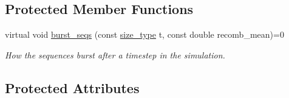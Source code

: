 \subsection*{Protected Member Functions}
\begin{DoxyCompactItemize}
\item 
virtual void \hyperlink{classretrocombinator_1_1Evolution_abab94a3f14460300a6a3b7a0286236a6}{burst\+\_\+seqs} (const \hyperlink{namespaceretrocombinator_a8e1541b50cee66a791df4c437ccbb385}{size\+\_\+type} t, const double recomb\+\_\+mean)=0
\begin{DoxyCompactList}\small\item\em How the sequences burst after a timestep in the simulation. \end{DoxyCompactList}\end{DoxyCompactItemize}
\subsection*{Protected Attributes}
